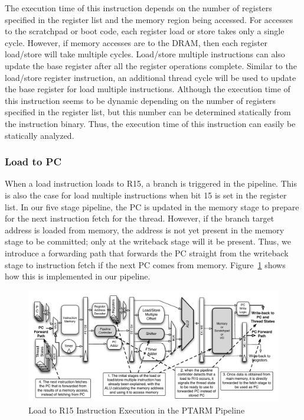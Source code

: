 The execution time of this instruction depends on the number of registers specified in the register list and the memory region being accessed. 
For accesses to the scratchpad or boot code, each register load or store takes only a single cycle. 
However, if memory accesses are to the DRAM, then each register load/store will take multiple cycles.
Load/store multiple instructions can also update the base register after all the register operations complete. 
Similar to the load/store register instruction, an additional thread cycle will be used to update the base register for load multiple instructions.
Although the execution time of this instruction seems to be dynamic depending on the number of registers specified in the register list, but this number can be determined statically from the instruction binary. 
Thus, the execution time of this instruction can easily be statically analyzed.   

\subsubsection{Load to PC}
\label{sec:load_to_pc}    
When a load instruction loads to R15, a branch is triggered in the pipeline.
This is also the case for load multiple instructions when bit 15 is set in the register list.
In our five stage pipeline, the PC is updated in the memory stage to prepare for the next instruction fetch for the thread.   
However, if the branch target address is loaded from memory, the address is not yet present in the memory stage to be committed; only at the writeback stage will it be present. 
Thus, we introduce a forwarding path that forwards the PC straight from the writeback stage to instruction fetch if the next PC comes from memory. 
Figure~\ref{fig:ld_to_pc_pipeline_implementation} shows how this is implemented in our pipeline.   

\begin{figure}[h]
  
  \begin{center}
    \includegraphics[scale=.54]{figs/ld_to_pc_pipeline_implementation}
  \end{center}
  \vspace{-3mm}
  \caption{Load to R15 Instruction Execution in the PTARM Pipeline}
  \label{fig:ld_to_pc_pipeline_implementation}
\end{figure}

